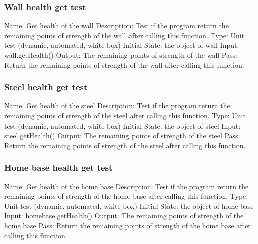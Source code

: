 \documentclass{article}
\begin{document}
\subsubsection{Wall health get test}
Name:  Get health of the wall\newline
Description: Test if the program return the remaining points of strength of the wall after calling this function. \newline
Type: Unit test (dynamic, automated, white box) \newline
Initial State:  the object of wall\newline
Input: wall.getHealth()\newline
Output: The remaining points of strength of the wall\newline
Pass:  Return the remaining points of strength of the wall after calling this function. \newline

\subsubsection{Steel health get test}
Name:  Get health of the steel\newline
Description: Test if the program return the remaining points of strength of the steel after calling this function. \newline
Type: Unit test (dynamic, automated, white box) \newline
Initial State:  the object of steel\newline
Input: steel.getHealth()\newline
Output: The remaining points of strength of the steel\newline
Pass:  Return the remaining points of strength of the steel after calling this function. \newline

\subsubsection{Home base health get test}
Name:  Get health of the home base\newline
Description: Test if the program return the remaining points of strength of the home base after calling this function. \newline
Type: Unit test (dynamic, automated, white box) \newline
Initial State:  the object of home base\newline
Input: homebase.getHealth()\newline
Output: The remaining points of strength of the home base\newline
Pass:  Return the remaining points of strength of the home base after calling this function. \newline
\end{document}
